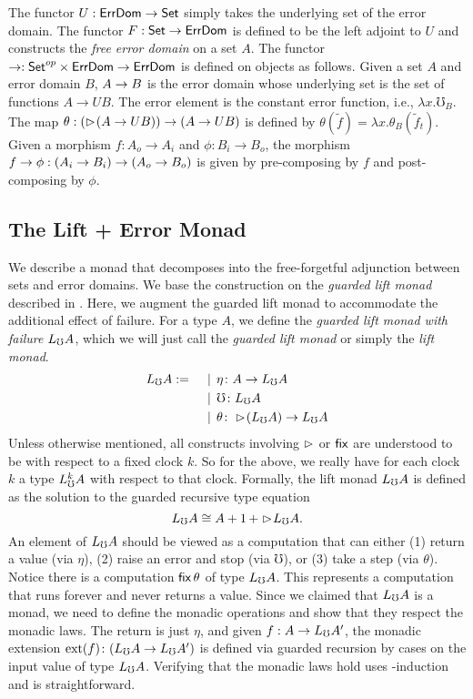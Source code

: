 The functor $U : \textsf{ErrDom} \to \mathsf{Set}$ simply takes the underlying set of the error
domain. The functor $F : \mathsf{Set} \to \textsf{ErrDom}$ is defined to be the left adjoint to
$U$ and constructs the \emph{free error domain} on a set $A$.
%
The functor $\to : \mathsf{Set}^{op} \times \textsf{ErrDom} \to \textsf{ErrDom}$ is defined on objects
as follows. Given a set $A$ and error domain $B$, $A \to B$ is the error domain
whose underlying set is the set of functions $A \to UB$. The error element is
the constant error function, i.e., $\lambda x. \mho_B$. The map $\theta :
(\vartriangleright \hspace{-0.2em} (A \to UB)) \to (A \to UB)$ is defined by 
$\theta(\tilde{f}) = \lambda x . \theta_B (\tilde{f}_t)$.
%
Given a morphism $f : A_o \to A_i$ and $\phi : B_i \to B_o$, the morphism $f
\to \phi : (A_i \to B_i) \to (A_o \to B_o)$ is given by pre-composing by $f$
and post-composing by $\phi$.

\subsection{The Lift + Error Monad}\label{sec:lift-monad}

We describe a monad that decomposes into the free-forgetful adjunction
between sets and error domains. We base the construction on the \emph{guarded
lift monad} described in \cite{mogelberg-paviotti2016}. Here, we augment the
guarded lift monad to accommodate the additional effect of failure. For a type
$A$, we define the \emph{guarded lift monad with failure} $L_\mho A$, which we will
just call the \emph{guarded lift monad} or simply the \emph{lift monad}.
%
\begin{align*}
  L_\mho A :=\quad
  &\mathrel{\bf \,\mid\,} \eta \colon A \to L_\mho A \\
  &\mathrel{\bf \,\mid\,} \mho \colon L_\mho A \\
  &\mathrel{\bf \,\mid\,} \theta \colon \vartriangleright \hspace{-0.2em} (L_\mho A) \to L_\mho A
\end{align*}
%
Unless otherwise mentioned, all constructs involving $\vartriangleright$ or $\mathsf{fix}$ are
understood to be with respect to a fixed clock $k$. So for the above, we really
have for each clock $k$ a type $L_\mho^k A$ with respect to that clock.
%
Formally, the lift monad $L_\mho A$ is defined as the solution to the guarded
recursive type equation
%
\[ L_\mho A \cong A + 1\, + \vartriangleright \hspace{-0.2em} L_\mho A. \]
%
An element of $L_\mho A$ should be viewed as a computation that can either (1)
return a value (via $\eta$), (2) raise an error and stop (via $\mho$), or (3)
take a step (via $\theta$).
%
Notice there is a computation $\mathsf{fix}\, \theta$ of type $L_\mho A$. This represents a
computation that runs forever and never returns a value.
%
Since we claimed that $L_\mho A$ is a monad, we need to define the monadic
operations and show that they respect the monadic laws. The return is just
$\eta$, and given $f : A \to L_\mho A'$, the monadic extension $\text{ext}(f)
\colon (L_\mho A \to L_\mho A')$ is defined via guarded recursion by cases on the
input value of type $L_\mho A$.
%
%
Verifying that the monadic laws hold uses \lob-induction and is straightforward.

